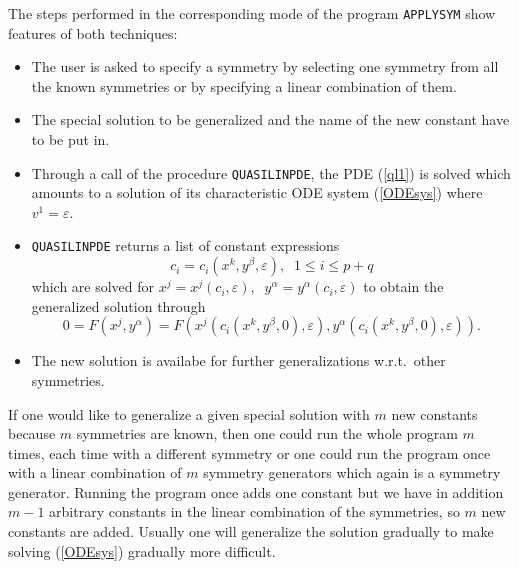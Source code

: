 The steps performed in the corresponding mode of the
program \texttt{APPLYSYM} show features of both techniques:
\begin{itemize}
\item The user is asked to specify a symmetry by selecting one symmetry
from all the known symmetries or by specifying a linear combination of them.
\item The special solution to be generalized and the name of the new
constant have to be put in.
\item Through a call of the procedure \texttt{QUASILINPDE}, the PDE (\ref{ql1})
is solved which amounts to a solution of its characteristic ODE system
(\ref{ODEsys}) where $v^1=\varepsilon$.
\item \texttt{QUASILINPDE} returns a list of constant expressions
\begin{equation}
c_i = c_i(x^k, y^\beta, \varepsilon),\;\;1\leq i\leq p+q
\end{equation}
which are solved for
$x^j=x^j(c_i,\varepsilon),\;\; y^\alpha=y^\alpha(c_i,\varepsilon)$
to obtain the generalized solution through
\[ 0 = F(x^j, y^\alpha)
     = F(     x^j(c_i(x^k, y^\beta, 0), \varepsilon),
         y^\alpha(c_i(x^k, y^\beta, 0), \varepsilon)). \]
\item The new solution is availabe for further generalizations w.r.t.\ other
symmetries.
\end{itemize}
If one would like to generalize a given special solution with $m$ new
constants because $m$ symmetries are known, then one could run the whole
program $m$ times, each time with a different symmetry or one could run the
program once with a linear combination of $m$ symmetry generators which
again is a symmetry generator. Running the program once adds one constant
but we have in addition $m-1$ arbitrary constants in the linear combination
of the symmetries, so $m$ new constants are added.
Usually one will generalize the solution gradually to make solving
(\ref{ODEsys}) gradually more difficult.
